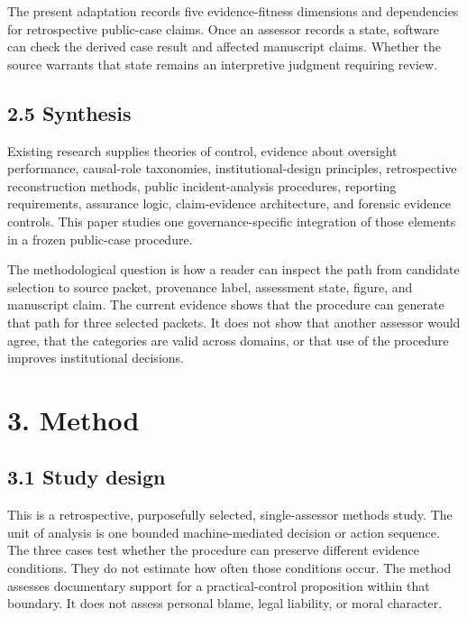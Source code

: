 \documentclass[11pt]{article}
\begin{document}
The present adaptation records five evidence-fitness dimensions and dependencies for retrospective public-case claims. Once an assessor records a state, software can check the derived case result and affected manuscript claims. Whether the source warrants that state remains an interpretive judgment requiring review.

\subsection*{2.5 Synthesis}

Existing research supplies theories of control, evidence about oversight performance, causal-role taxonomies, institutional-design principles, retrospective reconstruction methods, public incident-analysis procedures, reporting requirements, assurance logic, claim-evidence architecture, and forensic evidence controls. This paper studies one governance-specific integration of those elements in a frozen public-case procedure.

The methodological question is how a reader can inspect the path from candidate selection to source packet, provenance label, assessment state, figure, and manuscript claim. The current evidence shows that the procedure can generate that path for three selected packets. It does not show that another assessor would agree, that the categories are valid across domains, or that use of the procedure improves institutional decisions.

\section*{3. Method}

\subsection*{3.1 Study design}

This is a retrospective, purposefully selected, single-assessor methods study. The unit of analysis is one bounded machine-mediated decision or action sequence. The three cases test whether the procedure can preserve different evidence conditions. They do not estimate how often those conditions occur. The method assesses documentary support for a practical-control proposition within that boundary. It does not assess personal blame, legal liability, or moral character.
\end{document}
